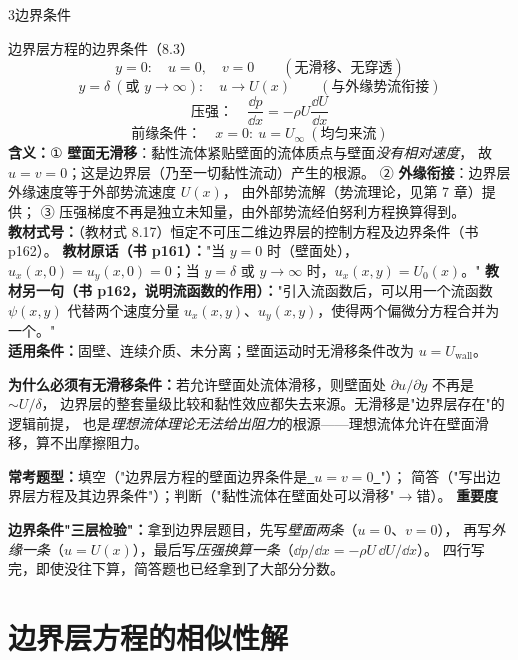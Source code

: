 \begin{kaodian}{3}{边界条件}
\begin{gongshi}{边界层方程的边界条件（8.3）}
\[ y=0:\quad u=0,\quad v=0\qquad(\text{无滑移、无穿透}) \]
\[ y=\delta\ (\text{或 }y\to\infty):\quad u\to U(x)\qquad(\text{与外缘势流衔接}) \]
\[ \text{压强：}\quad \frac{\dd p}{\dd x}=-\rho U\frac{\dd U}{\dd x} \]
\[ \text{前缘条件：}\quad x=0:\ u=U_\infty\ (\text{均匀来流}) \]
\textbf{含义：}① \textbf{壁面无滑移}：黏性流体紧贴壁面的流体质点与壁面\emph{没有相对速度}，
故 $u=v=0$；这是边界层（乃至一切黏性流动）产生的根源。
② \textbf{外缘衔接}：边界层外缘速度等于外部势流速度 $U(x)$，
由外部势流解（势流理论，见第 7 章）提供；
③ 压强梯度不再是独立未知量，由外部势流经伯努利方程换算得到。\\
\textbf{教材式号：}（教材式 8.17）恒定不可压二维边界层的控制方程及边界条件（书 p162）。
\textbf{教材原话（书 p161）：}"当 $y=0$ 时（壁面处），$u_x(x,0)=u_y(x,0)=0$；当 $y=\delta$ 或 $y\to\infty$ 时，$u_x(x,y)=U_0(x)$。"
\textbf{教材另一句（书 p162，说明流函数的作用）：}"引入流函数后，可以用一个流函数 $\psi(x,y)$ 代替两个速度分量
$u_x(x,y)$、$u_y(x,y)$，使得两个偏微分方程合并为一个。"\\
\textbf{适用条件：}固壁、连续介质、未分离；壁面运动时无滑移条件改为 $u=U_{\text{wall}}$。
\end{gongshi}

\textbf{为什么必须有无滑移条件：}若允许壁面处流体滑移，则壁面处 $\partial u/\partial y$ 不再是 $\sim U/\delta$，
边界层的整套量级比较和黏性效应都失去来源。无滑移是"边界层存在"的逻辑前提，
也是\emph{理想流体理论无法给出阻力}的根源——理想流体允许在壁面滑移，算不出摩擦阻力。

\textbf{常考题型：}填空（"边界层方程的壁面边界条件是\underline{\ $u=v=0$\ }"）；
简答（"写出边界层方程及其边界条件"）；判断（"黏性流体在壁面处可以滑移"$\to$错）。
\textbf{重要度 }\quad{}\quad{}

\begin{banfa}
\textbf{边界条件"三层检验"：}拿到边界层题目，先写\emph{壁面两条}（$u=0$、$v=0$），
再写\emph{外缘一条}（$u=U(x)$），最后写\emph{压强换算一条}（$\dd p/\dd x=-\rho U\,\dd U/\dd x$）。
四行写完，即使没往下算，简答题也已经拿到了大部分分数。
\end{banfa}
\end{kaodian}

\section{边界层方程的相似性解}

